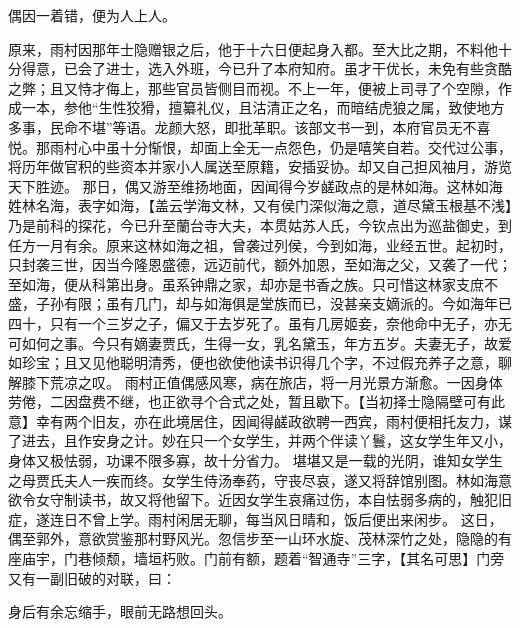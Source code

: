 \documentclass[12pt,oneside]{book}
\begin{document}
偶因一着错，便为人上人。

原来，雨村因那年士隐赠银之后，他于十六日便起身入都。至大比之期，不料他十分得意，已会了进士，选入外班，今已升了本府知府。虽才干优长，未免有些贪酷之弊；且又恃才侮上，那些官员皆侧目而视。不上一年，便被上司寻了个空隙，作成一本，参他“生性狡猾，擅纂礼仪，且沽清正之名，而暗结虎狼之属，致使地方多事，民命不堪”等语。龙颜大怒，即批革职。该部文书一到，本府官员无不喜悦。那雨村心中虽十分惭恨，却面上全无一点怨色，仍是嘻笑自若。交代过公事，将历年做官积的些资本并家小人属送至原籍，安插妥协。却又自己担风袖月，游览天下胜迹。
那日，偶又游至维扬地面，因闻得今岁鹾政点的是林如海。这林如海姓林名海，表字如海，【盖云学海文林，又有侯门深似海之意，道尽黛玉根基不浅】乃是前科的探花，今已升至蘭台寺大夫，本贯姑苏人氏，今钦点出为巡盐御史，到任方一月有余。原来这林如海之祖，曾袭过列侯，今到如海，业经五世。起初时，只封袭三世，因当今隆恩盛德，远迈前代，额外加恩，至如海之父，又袭了一代；至如海，便从科第出身。虽系钟鼎之家，却亦是书香之族。只可惜这林家支庶不盛，子孙有限；虽有几门，却与如海俱是堂族而已，没甚亲支嫡派的。今如海年已四十，只有一个三岁之子，偏又于去岁死了。虽有几房姬妾，奈他命中无子，亦无可如何之事。今只有嫡妻贾氏，生得一女，乳名黛玉，年方五岁。夫妻无子，故爱如珍宝；且又见他聪明清秀，便也欲使他读书识得几个字，不过假充养子之意，聊解膝下荒凉之叹。
雨村正值偶感风寒，病在旅店，将一月光景方渐愈。一因身体劳倦，二因盘费不继，也正欲寻个合式之处，暂且歇下。【当初择士隐隔壁可有此意】幸有两个旧友，亦在此境居住，因闻得鹾政欲聘一西宾，雨村便相托友力，谋了进去，且作安身之计。妙在只一个女学生，并两个伴读丫鬟，这女学生年又小，身体又极怯弱，功课不限多寡，故十分省力。
堪堪又是一载的光阴，谁知女学生之母贾氏夫人一疾而终。女学生侍汤奉药，守丧尽哀，遂又将辞馆别图。林如海意欲令女守制读书，故又将他留下。近因女学生哀痛过伤，本自怯弱多病的，触犯旧症，遂连日不曾上学。雨村闲居无聊，每当风日晴和，饭后便出来闲步。
这日，偶至郭外，意欲赏鉴那村野风光。忽信步至一山环水旋、茂林深竹之处，隐隐的有座庙宇，门巷倾颓，墙垣朽败。门前有额，题着“智通寺”三字，【其名可思】门旁又有一副旧破的对联，曰：

身后有余忘缩手，眼前无路想回头。
\end{document}
